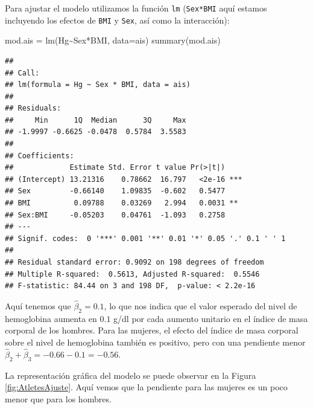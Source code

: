 \documentclass[
]{article}
\newenvironment{Shaded}{\begin{snugshade}}{\end{snugshade}}
\newcommand{\AttributeTok}[1]{\textcolor[rgb]{0.77,0.63,0.00}{#1}}
\newcommand{\FunctionTok}[1]{\textcolor[rgb]{0.00,0.00,0.00}{#1}}
\newcommand{\NormalTok}[1]{#1}
\newcommand{\OtherTok}[1]{\textcolor[rgb]{0.56,0.35,0.01}{#1}}
\newcommand{\SpecialCharTok}[1]{\textcolor[rgb]{0.00,0.00,0.00}{#1}}
\begin{document}
Para ajustar el modelo utilizamos la función \texttt{lm} (\texttt{Sex*BMI} aquí estamos incluyendo los efectos de \texttt{BMI} y \texttt{Sex}, así como la interacción):

\begin{Shaded}
\begin{Highlighting}[]
\NormalTok{mod.ais }\OtherTok{=} \FunctionTok{lm}\NormalTok{(Hg}\SpecialCharTok{\textasciitilde{}}\NormalTok{Sex}\SpecialCharTok{*}\NormalTok{BMI, }\AttributeTok{data=}\NormalTok{ais)}
\FunctionTok{summary}\NormalTok{(mod.ais)}
\end{Highlighting}
\end{Shaded}

\begin{verbatim}
## 
## Call:
## lm(formula = Hg ~ Sex * BMI, data = ais)
## 
## Residuals:
##     Min      1Q  Median      3Q     Max 
## -1.9997 -0.6625 -0.0478  0.5784  3.5583 
## 
## Coefficients:
##             Estimate Std. Error t value Pr(>|t|)    
## (Intercept) 13.21316    0.78662  16.797   <2e-16 ***
## Sex         -0.66140    1.09835  -0.602   0.5477    
## BMI          0.09788    0.03269   2.994   0.0031 ** 
## Sex:BMI     -0.05203    0.04761  -1.093   0.2758    
## ---
## Signif. codes:  0 '***' 0.001 '**' 0.01 '*' 0.05 '.' 0.1 ' ' 1
## 
## Residual standard error: 0.9092 on 198 degrees of freedom
## Multiple R-squared:  0.5613, Adjusted R-squared:  0.5546 
## F-statistic: 84.44 on 3 and 198 DF,  p-value: < 2.2e-16
\end{verbatim}

Aquí tenemos que \(\widehat{\beta}_{2} =0.1\), lo que nos indica que el valor esperado del nivel de hemoglobina aumenta en \(0.1\) g/dl por cada aumento unitario en el índice de masa corporal de los hombres. Para las mujeres, el efecto del índice de masa corporal sobre el nivel de hemoglobina también es positivo, pero con una pendiente menor \(\widehat{\beta}_{2} +\widehat{\beta}_{3} = -0.66 - 0.1 = -0.56\).

La representación gráfica del modelo se puede observar en la Figura \ref{fig:AtletesAjuste}. Aquí vemos que la pendiente para las mujeres es un poco menor que para los hombres.
\end{document}

